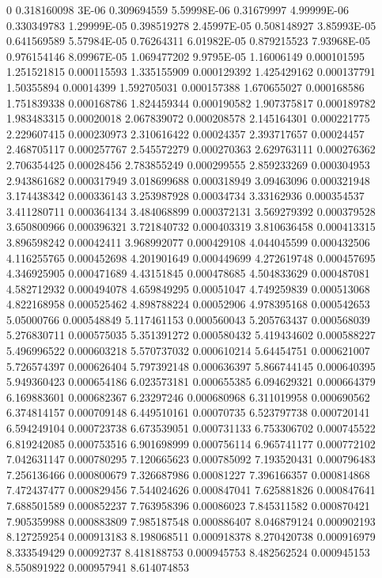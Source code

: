 0	0.318160098
3E-06	0.309694559
5.59998E-06	0.31679997
4.99999E-06	0.330349783
1.29999E-05	0.398519278
2.45997E-05	0.508148927
3.85993E-05	0.641569589
5.57984E-05	0.76264311
6.01982E-05	0.879215523
7.93968E-05	0.976154146
8.09967E-05	1.069477202
9.9795E-05	1.16006149
0.000101595	1.251521815
0.000115593	1.335155909
0.000129392	1.425429162
0.000137791	1.50355894
0.00014399	1.592705031
0.000157388	1.670655027
0.000168586	1.751839338
0.000168786	1.824459344
0.000190582	1.907375817
0.000189782	1.983483315
0.00020018	2.067839072
0.000208578	2.145164301
0.000221775	2.229607415
0.000230973	2.310616422
0.00024357	2.393717657
0.00024457	2.468705117
0.000257767	2.545572279
0.000270363	2.629763111
0.000276362	2.706354425
0.00028456	2.783855249
0.000299555	2.859233269
0.000304953	2.943861682
0.000317949	3.018699688
0.000318949	3.09463096
0.000321948	3.174438342
0.000336143	3.253987928
0.00034734	3.33162936
0.000354537	3.411280711
0.000364134	3.484068899
0.000372131	3.569279392
0.000379528	3.650800966
0.000396321	3.721840732
0.000403319	3.810636458
0.000413315	3.896598242
0.00042411	3.968992077
0.000429108	4.044045599
0.000432506	4.116255765
0.000452698	4.201901649
0.000449699	4.272619748
0.000457695	4.346925905
0.000471689	4.43151845
0.000478685	4.504833629
0.000487081	4.582712932
0.000494078	4.659849295
0.00051047	4.749259839
0.000513068	4.822168958
0.000525462	4.898788224
0.00052906	4.978395168
0.000542653	5.05000766
0.000548849	5.117461153
0.000560043	5.205763437
0.000568039	5.276830711
0.000575035	5.351391272
0.000580432	5.419434602
0.000588227	5.496996522
0.000603218	5.570737032
0.000610214	5.64454751
0.000621007	5.726574397
0.000626404	5.797392148
0.000636397	5.866744145
0.000640395	5.949360423
0.000654186	6.023573181
0.000655385	6.094629321
0.000664379	6.169883601
0.000682367	6.23297246
0.000680968	6.311019958
0.000690562	6.374814157
0.000709148	6.449510161
0.00070735	6.523797738
0.000720141	6.594249104
0.000723738	6.673539051
0.000731133	6.753306702
0.000745522	6.819242085
0.000753516	6.901698999
0.000756114	6.965741177
0.000772102	7.042631147
0.000780295	7.120665623
0.000785092	7.193520431
0.000796483	7.256136466
0.000800679	7.326687986
0.00081227	7.396166357
0.000814868	7.472437477
0.000829456	7.544024626
0.000847041	7.625881826
0.000847641	7.688501589
0.000852237	7.763958396
0.00086023	7.845311582
0.000870421	7.905359988
0.000883809	7.985187548
0.000886407	8.046879124
0.000902193	8.127259254
0.000913183	8.198068511
0.000918378	8.270420738
0.000916979	8.333549429
0.00092737	8.418188753
0.000945753	8.482562524
0.000945153	8.550891922
0.000957941	8.614074853
